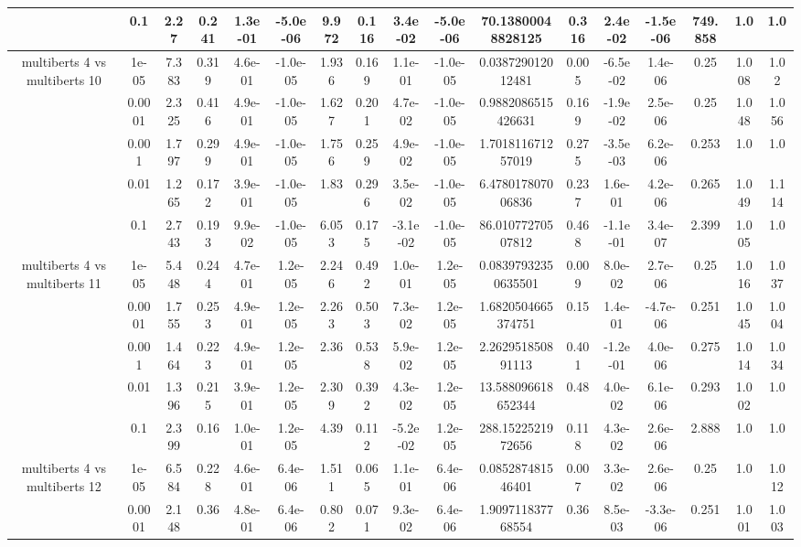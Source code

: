 \begin{tabular}{|c|c|c|c|c|c|c|c|c|c|c|c|c|c|c|c|c|}
 & 0.1 & 2.27 & 0.241 & 1.3e-01 & -5.0e-06 & 9.972 & 0.116 & 3.4e-02 & -5.0e-06 & 70.13800048828125 & 0.316 & 2.4e-02 & -1.5e-06 & 749.858 & 1.0 & 1.0 \\
\hline
\multirow{5}{*}{multiberts 4 vs multiberts 10} & 1e-05 & 7.383 & 0.319 & 4.6e-01 & -1.0e-05 & 1.936 & 0.169 & 1.1e-01 & -1.0e-05 & 0.038729012012481 & 0.005 & -6.5e-02 & 1.4e-06 & 0.25 & 1.008 & 1.02 \\
 & 0.0001 & 2.325 & 0.416 & 4.9e-01 & -1.0e-05 & 1.627 & 0.201 & 4.7e-02 & -1.0e-05 & 0.9882086515426631 & 0.169 & -1.9e-02 & 2.5e-06 & 0.25 & 1.048 & 1.056 \\
 & 0.001 & 1.797 & 0.299 & 4.9e-01 & -1.0e-05 & 1.756 & 0.259 & 4.9e-02 & -1.0e-05 & 1.701811671257019 & 0.275 & -3.5e-03 & 6.2e-06 & 0.253 & 1.0 & 1.0 \\
 & 0.01 & 1.265 & 0.172 & 3.9e-01 & -1.0e-05 & 1.83 & 0.296 & 3.5e-02 & -1.0e-05 & 6.478017807006836 & 0.237 & 1.6e-01 & 4.2e-06 & 0.265 & 1.049 & 1.114 \\
 & 0.1 & 2.743 & 0.193 & 9.9e-02 & -1.0e-05 & 6.053 & 0.175 & -3.1e-02 & -1.0e-05 & 86.01077270507812 & 0.468 & -1.1e-01 & 3.4e-07 & 2.399 & 1.005 & 1.0 \\
\hline
\multirow{5}{*}{multiberts 4 vs multiberts 11} & 1e-05 & 5.448 & 0.244 & 4.7e-01 & 1.2e-05 & 2.246 & 0.492 & 1.0e-01 & 1.2e-05 & 0.08397932350635501 & 0.009 & 8.0e-02 & 2.7e-06 & 0.25 & 1.016 & 1.037 \\
 & 0.0001 & 1.755 & 0.253 & 4.9e-01 & 1.2e-05 & 2.263 & 0.503 & 7.3e-02 & 1.2e-05 & 1.6820504665374751 & 0.15 & 1.4e-01 & -4.7e-06 & 0.251 & 1.045 & 1.004 \\
 & 0.001 & 1.464 & 0.223 & 4.9e-01 & 1.2e-05 & 2.36 & 0.538 & 5.9e-02 & 1.2e-05 & 2.262951850891113 & 0.401 & -1.2e-01 & 4.0e-06 & 0.275 & 1.014 & 1.034 \\
 & 0.01 & 1.396 & 0.215 & 3.9e-01 & 1.2e-05 & 2.309 & 0.392 & 4.3e-02 & 1.2e-05 & 13.588096618652344 & 0.48 & 4.0e-02 & 6.1e-06 & 0.293 & 1.002 & 1.0 \\
 & 0.1 & 2.399 & 0.16 & 1.0e-01 & 1.2e-05 & 4.39 & 0.112 & -5.2e-02 & 1.2e-05 & 288.1522521972656 & 0.118 & 4.3e-02 & 2.6e-06 & 2.888 & 1.0 & 1.0 \\
\hline
\multirow{5}{*}{multiberts 4 vs multiberts 12} & 1e-05 & 6.584 & 0.228 & 4.6e-01 & 6.4e-06 & 1.511 & 0.065 & 1.1e-01 & 6.4e-06 & 0.085287481546401 & 0.007 & 3.3e-02 & 2.6e-06 & 0.25 & 1.0 & 1.012 \\
 & 0.0001 & 2.148 & 0.36 & 4.8e-01 & 6.4e-06 & 0.802 & 0.071 & 9.3e-02 & 6.4e-06 & 1.909711837768554 & 0.36 & 8.5e-03 & -3.3e-06 & 0.251 & 1.001 & 1.003 \\

\end{tabular}
